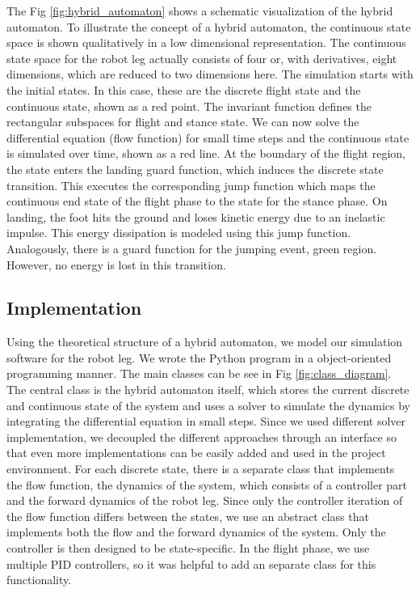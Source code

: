 \documentclass[10pt,conference]{IEEEtran}
\begin{document}
The Fig \ref{fig:hybrid_automaton} shows a schematic visualization of the hybrid automaton. To illustrate the concept of a hybrid automaton, the continuous state space is shown qualitatively in a low dimensional representation. The continuous state space for the robot leg actually consists of four or, with derivatives, eight dimensions, which are reduced to two dimensions here. The simulation starts with the initial states. In this case, these are the discrete flight state and the continuous state, shown as a red point. The invariant function defines the rectangular subspaces for flight and stance state. We can now solve the differential equation (flow function) for small time steps and the continuous state is simulated over time, shown as a red line. At the boundary of the flight region, the state enters the landing guard function, which induces the discrete state transition. This executes the corresponding jump function which maps the continuous end state of the flight phase to the state for the stance phase. On landing, the foot hits the ground and loses kinetic energy due to an inelastic impulse. This energy dissipation is modeled using this jump function. Analogously, there is a guard function for the jumping event, green region. However, no energy is lost in this transition.


\subsection{Implementation}
Using the theoretical structure of a hybrid automaton, we model our simulation software for the robot leg. We wrote the Python program in a object-oriented programming manner. The main classes can be see in Fig \ref{fig:class_diagram}. The central class is the hybrid automaton itself, which stores the current discrete and continuous state of the system and uses a solver to simulate the dynamics by integrating the differential equation in small steps. Since we used different solver implementation, we decoupled the different approaches through an interface so that even more implementations can be easily added and used in the project environment. For each discrete state, there is a separate class that implements the flow function, the dynamics of the system, which consists of a controller part and the forward dynamics of the robot leg. Since only the controller iteration of the flow function differs between the states, we use an abstract class that implements both the flow and the forward dynamics of the system. Only the controller is then designed to be state-specific. In the flight phase, we use multiple PID controllers, so it was helpful to add an separate class for this functionality.
\end{document}
